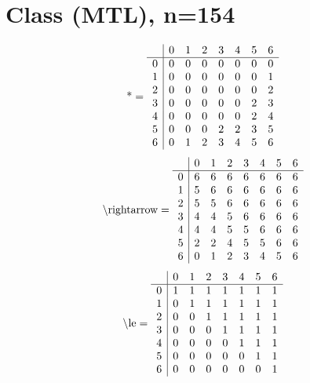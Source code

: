 \documentclass[11pt]{article}
\begin{document}
\section{Class (MTL), n=154}
\[\text{*} = 
\begin{array}{r | r r r r r r r}
 & 0 & 1 & 2 & 3 & 4 & 5 & 6 \\ \hline
0 & 0 & 0 & 0 & 0 & 0 & 0 & 0 \\
1 & 0 & 0 & 0 & 0 & 0 & 0 & 1 \\
2 & 0 & 0 & 0 & 0 & 0 & 0 & 2 \\
3 & 0 & 0 & 0 & 0 & 0 & 2 & 3 \\
4 & 0 & 0 & 0 & 0 & 0 & 2 & 4 \\
5 & 0 & 0 & 0 & 2 & 2 & 3 & 5 \\
6 & 0 & 1 & 2 & 3 & 4 & 5 & 6 \\
\end{array}
\]
\[\text{\textbackslash rightarrow} = 
\begin{array}{r | r r r r r r r}
 & 0 & 1 & 2 & 3 & 4 & 5 & 6 \\ \hline
0 & 6 & 6 & 6 & 6 & 6 & 6 & 6 \\
1 & 5 & 6 & 6 & 6 & 6 & 6 & 6 \\
2 & 5 & 5 & 6 & 6 & 6 & 6 & 6 \\
3 & 4 & 4 & 5 & 6 & 6 & 6 & 6 \\
4 & 4 & 4 & 5 & 5 & 6 & 6 & 6 \\
5 & 2 & 2 & 4 & 5 & 5 & 6 & 6 \\
6 & 0 & 1 & 2 & 3 & 4 & 5 & 6 \\
\end{array}
\]
\[\text{\textbackslash le} = 
\begin{array}{r | r r r r r r r}
 & 0 & 1 & 2 & 3 & 4 & 5 & 6 \\ \hline
0 & 1 & 1 & 1 & 1 & 1 & 1 & 1 \\
1 & 0 & 1 & 1 & 1 & 1 & 1 & 1 \\
2 & 0 & 0 & 1 & 1 & 1 & 1 & 1 \\
3 & 0 & 0 & 0 & 1 & 1 & 1 & 1 \\
4 & 0 & 0 & 0 & 0 & 1 & 1 & 1 \\
5 & 0 & 0 & 0 & 0 & 0 & 1 & 1 \\
6 & 0 & 0 & 0 & 0 & 0 & 0 & 1 \\
\end{array}
\]
\end{document}
